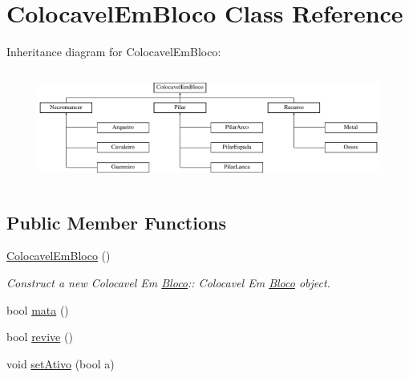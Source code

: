 \hypertarget{class_colocavel_em_bloco}{}\section{Colocavel\+Em\+Bloco Class Reference}
\label{class_colocavel_em_bloco}
Inheritance diagram for Colocavel\+Em\+Bloco\+:\begin{figure}[H]
\begin{center}
\leavevmode
\includegraphics[height=3.703704cm]{class_colocavel_em_bloco}
\end{center}
\end{figure}
\subsection*{Public Member Functions}
\begin{DoxyCompactItemize}
\item 
\mbox{\label{class_colocavel_em_bloco_a3e99f0924333aa4473cc59588acec5dc}} 
\mbox{\hyperlink{class_colocavel_em_bloco_a3e99f0924333aa4473cc59588acec5dc}{Colocavel\+Em\+Bloco}} ()
\begin{DoxyCompactList}\small\item\em Construct a new Colocavel Em \mbox{\hyperlink{class_bloco}{Bloco}}\+:\+: Colocavel Em \mbox{\hyperlink{class_bloco}{Bloco}} object. \end{DoxyCompactList}\item 
bool \mbox{\hyperlink{class_colocavel_em_bloco_a89177aadb9f7fd73431adcb29b90f887}{mata}} ()
\item 
bool \mbox{\hyperlink{class_colocavel_em_bloco_a82f12304bcb919f4fe3fc765d00a3d0f}{revive}} ()
\item 
void \mbox{\hyperlink{class_colocavel_em_bloco_a1d45029183e2b8fe4790d44ca0fa3484}{set\+Ativo}} (bool a)
\end{DoxyCompactItemize}

